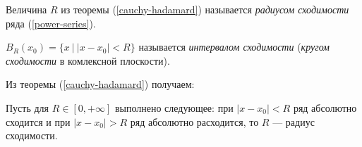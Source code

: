 \begin{definition}
    Величина $R$ из теоремы (\ref{cauchy-hadamard}) называется \emph{радиусом сходимости} ряда (\ref{power-series}).

    $B_R(x_0) = \{x \ | \ |x - x_0| < R\}$ называется \emph{интервалом сходимости} (\emph{кругом сходимости} в комлексной плоскости).
\end{definition}

Из теоремы (\ref{cauchy-hadamard}) получаем:
\begin{corollary}
    Пусть для $R \in [0, +\infty]$ выполнено следующее: при $|x - x_0| < R$ ряд абсолютно сходится и при $|x - x_0| > R$ ряд абсолютно расходится, то $R$ --- радиус сходимости. 
\end{corollary}